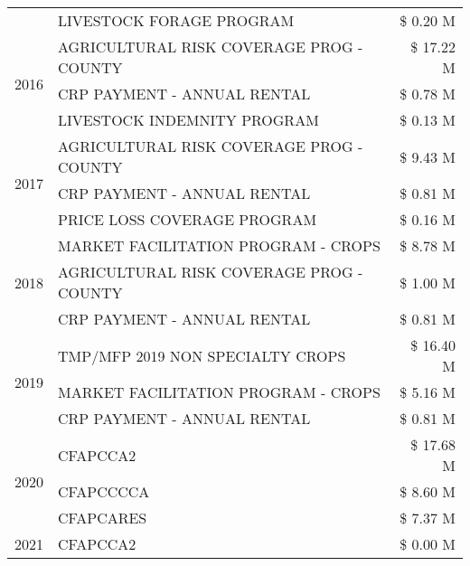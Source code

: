\begin{tabular}{llr}
 & LIVESTOCK FORAGE PROGRAM & \$ 0.20 M \\
\cline{1-3}
\multirow[t]{3}{*}{2016} & AGRICULTURAL RISK COVERAGE PROG - COUNTY & \$ 17.22 M \\
 & CRP PAYMENT - ANNUAL RENTAL & \$ 0.78 M \\
 & LIVESTOCK INDEMNITY PROGRAM & \$ 0.13 M \\
\cline{1-3}
\multirow[t]{3}{*}{2017} & AGRICULTURAL RISK COVERAGE PROG - COUNTY & \$ 9.43 M \\
 & CRP PAYMENT - ANNUAL RENTAL & \$ 0.81 M \\
 & PRICE LOSS COVERAGE PROGRAM & \$ 0.16 M \\
\cline{1-3}
\multirow[t]{3}{*}{2018} & MARKET FACILITATION PROGRAM - CROPS & \$ 8.78 M \\
 & AGRICULTURAL RISK COVERAGE PROG - COUNTY & \$ 1.00 M \\
 & CRP PAYMENT - ANNUAL RENTAL & \$ 0.81 M \\
\cline{1-3}
\multirow[t]{3}{*}{2019} & TMP/MFP 2019 NON SPECIALTY CROPS & \$ 16.40 M \\
 & MARKET FACILITATION PROGRAM - CROPS & \$ 5.16 M \\
 & CRP PAYMENT - ANNUAL RENTAL & \$ 0.81 M \\
\cline{1-3}
\multirow[t]{3}{*}{2020} & CFAPCCA2 & \$ 17.68 M \\
 & CFAPCCCCA & \$ 8.60 M \\
 & CFAPCARES & \$ 7.37 M \\
\cline{1-3}
2021 & CFAPCCA2 & \$ 0.00 M \\
\cline{1-3}
\bottomrule
\end{tabular}
